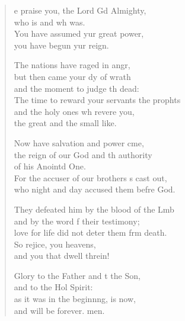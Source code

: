 \begin{verse}
  \begin{patverse}
e praise you, the Lord Gd Almighty,\Med\\
who is and wh was.\\
You have assumed yur great power,\Med\\
you have begun yur reign.

The nations have raged in angr,\Flex\\
but then came your dy of wrath\Med\\
and the moment to judge th dead:\\
The time to reward your servants the prophts\Flex\\
and the holy ones wh revere you,\Med\\
the great and the small like.

Now have salvation and power cme,\Flex\\
the reign of our God and th authority\Med\\
of his Anointd One.\\
For the accuser of our brothers \pointup{\i}s cast out,\Med\\
who night and day accused them befre God.

They defeated him by the blood of the Lmb\Flex\\
and by the word f their testimony;\Med\\
love for life did not deter them frm death.\\
So rejice, you heavens,\Med\\
and you that dwell threin!

Glory to the Father and t the Son,\Med\\
and to the Hol Spirit:\\
as it was in the beginn\pointup{\i}ng, is now,\Med\\
and will be forever. men. 
  \end{patverse}
\end{verse}
